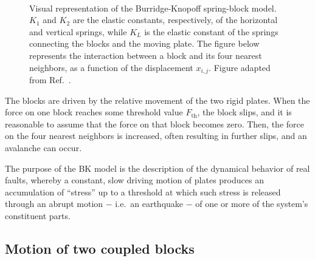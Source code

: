 \begin{figure}[!htbp]
    \centering
    \\[0.43cm]
    \caption{Visual representation of the Burridge-Knopoff spring-block model. $K_1$ and $K_2$
    are the elastic constants, respectively, of the horizontal and vertical springs, while $K_L$
    is the elastic constant of the springs connecting the blocks and the moving plate.
    The figure below represents the interaction between a block and its four nearest neighbors,
    as a function of the displacement $x_{i,j}$. Figure adapted from Ref.~\cite{ref:ofc}.
    }\label{fig bk}
\end{figure}

The blocks are driven by the relative movement of the two rigid plates. When the force on one block
reaches some threshold value $F_{\text{th}}$, the block slips, and it is reasonable to assume that the
force on that block becomes zero. Then, the force on the four nearest neighbors is increased, often
resulting in further slips, and an avalanche can occur.

The purpose of the BK model is the description of the dynamical behavior of
real faults, whereby a constant, slow driving motion of plates produces an accumulation of ``stress''
up to a threshold at which such stress is released through an abrupt motion $-$ i.e.\ an earthquake $-$
of one or more of the system's constituent parts.

\subsection{Motion of two coupled blocks}\label{subsec: diff eqs for two blocks}

